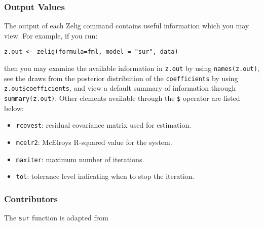 \documentclass[12pt]{book}%
\begin{document}
\subsubsection{Output Values}
The output of each Zelig command contains useful information which you may
view. For example, if you run:
\begin{verbatim}
z.out <- zelig(formula=fml, model = "sur", data)
\end{verbatim}
\noindent then you may examine the available information in \texttt{z.out} by
using \texttt{names(z.out)}, see the draws from the posterior distribution of
the \texttt{coefficients} by using \texttt{z.out\$coefficients}, and view a default
summary of information through \texttt{summary(z.out)}. Other elements
available through the \texttt{\$} operator are listed below:
\begin{itemize}
\item \texttt{rcovest}: residual covariance matrix used for estimation.
\item \texttt{mcelr2}: McElroys R-squared value for the system.
\end{itemize}

\begin{itemize}
\item \texttt{maxiter}: maximum number of iterations.
\item \texttt{tol}: tolerance level indicating when to stop the iteration.
\end{itemize}
\subsubsection{Contributors}
The \texttt{sur} function is adapted from 
\end{document}
